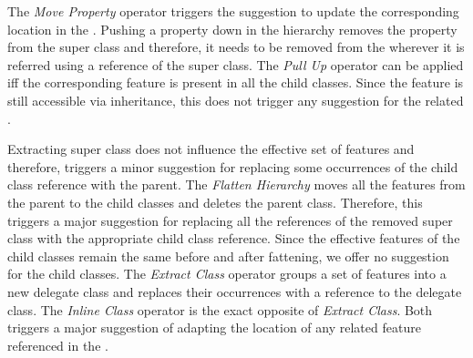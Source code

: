 The \textit{Move Property} operator triggers the suggestion to update the corresponding location in the \viewtype. Pushing a property down in the hierarchy removes the property from the super class and therefore, it needs to be removed from the \viewtype wherever it is referred using a reference of the super class. The \textit{Pull Up} operator can be applied iff the corresponding feature is present in all the child classes. Since the feature is still accessible via inheritance, this does not trigger any suggestion for the related \viewtypes.

Extracting super class does not influence the effective set of features and therefore, triggers a minor suggestion for replacing some occurrences of the child class reference with the parent. The \textit{Flatten Hierarchy} moves all the features from the parent to the child classes and deletes the parent class. Therefore, this triggers a major suggestion for replacing all the references of the removed super class with the appropriate child class reference. Since the effective features of the child classes remain the same before and after fattening, we offer no suggestion for the child classes. The \textit{Extract Class} operator groups a set of features into a new delegate class and replaces their occurrences with a reference to the delegate class. The \textit{Inline Class} operator is the exact opposite of \textit{Extract Class}. Both triggers a major suggestion of adapting the location of any related feature referenced in the \viewtype.

